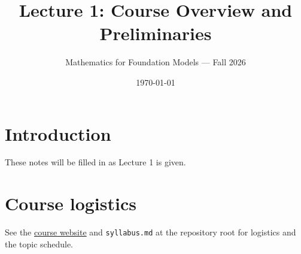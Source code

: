 \documentclass[11pt]{article}
\title{Lecture 1: Course Overview and Preliminaries}
\author{Mathematics for Foundation Models --- Fall 2026}
\date{\today}
\begin{document}
\maketitle

\section{Introduction}

These notes will be filled in as Lecture 1 is given.

\section{Course logistics}

See the
\href{https://math.jhu.edu/~feilu/26Fall_topicsDS/topicDS26.html}{course
website} and \texttt{syllabus.md} at the repository root for logistics and
the topic schedule.
\end{document}
